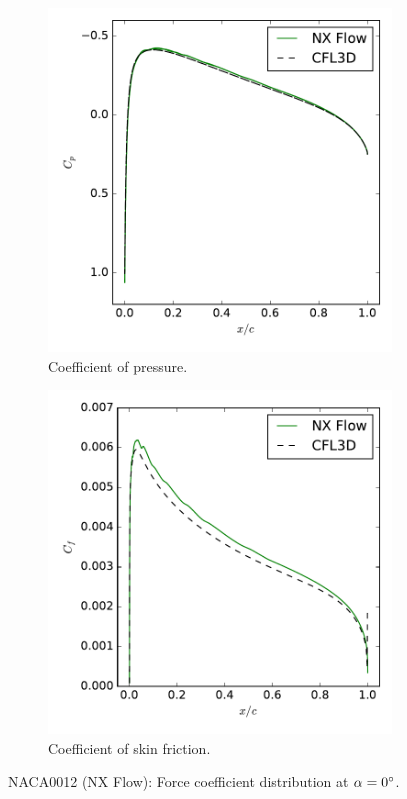 \begin{figure}[ht!]
\centering
\begin{subfigure}{.45\textwidth}
  \centering
  \includegraphics[width=1.0\textwidth]{figs/naca0012/cp_0.pdf}
  \caption{Coefficient of pressure.}
\end{subfigure}%
\begin{subfigure}{.45\textwidth}
  \centering
  \includegraphics[width=1.0\textwidth]{figs/naca0012/cf_0.pdf}
  \caption{Coefficient of skin friction.}
\end{subfigure}
\caption{NACA0012 (NX Flow): Force coefficient distribution at $\alpha = 0^\circ$.}
\label{fig:naca0012_0}
\end{figure}

